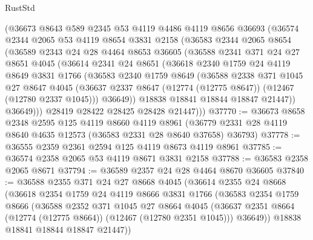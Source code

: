 \begin{lexlean}{RustStd}
\begin{coremodule}
      (@36673
        @8643
        @589
        @2345
        @53
        @4119
        @4486
        @4119
        @8656
        @36693
        (@36574
          @2344
          @2065
          @53
          @4119
          @8654
          @3831
          @2158
          (@36583
            @2344
            @2065
            @8654
            (@36589
              @2343
              @24
              @28
              @4464
              @8653
              @36605
              (@36588
                @2341
                @371
                @24
                @27
                @8651
                @4045
                (@36614
                  @2341
                  @24
                  @8651
                  (@36618
                    @2340
                    @1759
                    @24
                    @4119
                    @8649
                    @3831
                    @1766
                    (@36583
                      @2340
                      @1759
                      @8649
                      (@36588
                        @2338
                        @371
                        @1045
                        @27
                        @8647
                        @4045
                        (@36637 @2337 @8647 (@12774 (@12775 @8647)) (@12467 (@12780 @2337 @1045)))
                        @36649))
                    @18838
                    @18841
                    @18844
                    @18847
                    @21447))
                @36649)))
          @28419
          @28422
          @28425
          @28428
          @21447)))
@37770 := @36673
    @8658
    @2348
    @2595
    @125
    @4119
    @8660
    @4119
    @8961
    (@36779 @2331 @28 @4119 @8640 @4635 @12573 (@36583 @2331 @28 @8640 @37658) @36793)
@37778 := @36555 @2359 @2361 @2594 @125 @4119 @8673 @4119 @8961
@37785 := @36574 @2358 @2065 @53 @4119 @8671 @3831 @2158
@37788 := @36583 @2358 @2065 @8671
@37794 := @36589 @2357 @24 @28 @4464 @8670 @36605
@37840 := @36588
    @2355
    @371
    @24
    @27
    @8668
    @4045
    (@36614
      @2355
      @24
      @8668
      (@36618
        @2354
        @1759
        @24
        @4119
        @8666
        @3831
        @1766
        (@36583
          @2354
          @1759
          @8666
          (@36588
            @2352
            @371
            @1045
            @27
            @8664
            @4045
            (@36637 @2351 @8664 (@12774 (@12775 @8664)) (@12467 (@12780 @2351 @1045)))
            @36649))
        @18838
        @18841
        @18844
        @18847
        @21447))

\end{coremodule}
\end{lexlean}
